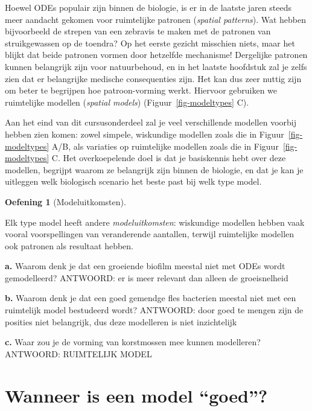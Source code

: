 \documentclass[
  a4paper,
]{scrbook}
\theoremstyle{definition}
\newtheorem{exercise}{Oefening}[chapter]
\theoremstyle{remark}
\begin{document}
Hoewel ODEs populair zijn binnen de biologie, is er in de laatste jaren
steeds meer aandacht gekomen voor ruimtelijke patronen (\emph{spatial
patterns}). Wat hebben bijvoorbeeld de strepen van een zebravis te maken
met de patronen van struikgewassen op de toendra? Op het eerste gezicht
misschien niets, maar het blijkt dat beide patronen vormen door
hetzelfde mechanisme! Dergelijke patronen kunnen belangrijk zijn voor
natuurbehoud, en in het laatste hoofdstuk zal je zelfs zien dat er
belangrijke medische consequenties zijn. Het kan dus zeer nuttig zijn om
beter te begrijpen hoe patroon-vorming werkt. Hiervoor gebruiken we
ruimtelijke modellen (\emph{spatial models})
(Figuur~\ref{fig-modeltypes} C).

Aan het eind van dit cursusonderdeel zal je veel verschillende modellen
voorbij hebben zien komen: zowel simpele, wiskundige modellen zoals die
in Figuur~\ref{fig-modeltypes} A/B, als variaties op ruimtelijke
modellen zoals die in Figuur~\ref{fig-modeltypes} C. Het overkoepelende
doel is dat je basiskennis hebt over deze modellen, begrijpt waarom ze
belangrijk zijn binnen de biologie, en dat je kan je uitleggen welk
biologisch scenario het beste past bij welk type model.

\begin{exercise}[Modeluitkomsten]\protect\hypertarget{exr-modeluitkomsten}{}\label{exr-modeluitkomsten}

Elk type model heeft andere \emph{modeluitkomsten}: wiskundige modellen
hebben vaak vooral voorspellingen van veranderende aantallen, terwijl
ruimtelijke modellen ook patronen als resultaat hebben.

\textbf{a.} Waarom denk je dat een groeiende biofilm meestal niet met
ODEs wordt gemodelleerd? ANTWOORD: er is meer relevant dan alleen de
groeisnelheid

\textbf{b.} Waarom denk je dat een goed gemendge fles bacterien meestal
niet met een ruimtelijk model bestudeerd wordt? ANTWOORD: door goed te
mengen zijn de posities niet belangrijk, dus deze modelleren is niet
inzichtelijk

\textbf{c.} Waar zou je de vorming van korstmossen mee kunnen
modelleren? ANTWOORD: RUIMTELIJK MODEL

\end{exercise}

\section{Wanneer is een model
``goed''?}\label{wanneer-is-een-model-goed}
\end{document}
